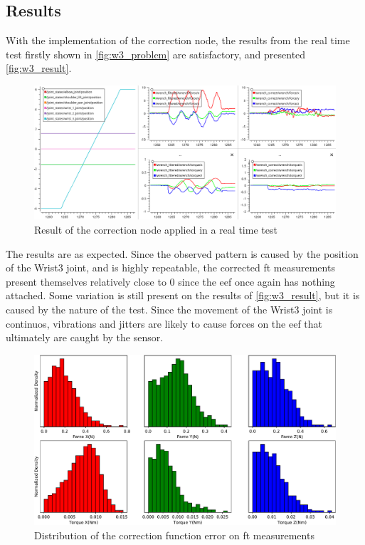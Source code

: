 
\subsection{Results}

\par With the implementation of the correction node, the results from the real time test firstly shown in \autoref{fig:w3_problem} are satisfactory, and presented \autoref{fig:w3_result}.

\begin{figure}[h]
    \centering
    \includegraphics[width=0.9\linewidth]{figs/chp3/wrist_3_result.png}
    \caption{Result of the correction node applied in a real time test}
    \label{fig:w3_result}
\end{figure}

\par The results are as expected. Since the observed pattern is caused by the position of the Wrist3 joint, and is highly repeatable, the corrected \ac{ft} measurements present themselves relatively close to 0 since the \ac{eef} once again has nothing attached. Some variation is still present on the results of \autoref{fig:w3_result}, but it is caused by the nature of the test. Since the movement of the Wrist3 joint is continuos, vibrations and jitters are likely to cause forces on the \ac{eef} that ultimately are caught by the sensor.


\begin{figure}[h]
    \centering
    \includegraphics[width=0.8\linewidth]{figs/chp3/wrist_3_result_hist.pdf}
    \caption{Distribution of the correction function error on \ac{ft} measurements}
    \label{fig:w3_result_hist}
\end{figure}

